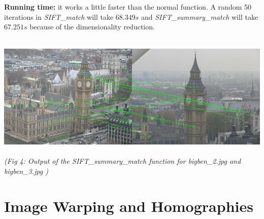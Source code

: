\documentclass{article}
\begin{document}
\begin{enumerate}
				\textbf{Running time:} it works a little faster than the normal function. A random 50 iterations in \textit{SIFT\_match} will take $68.349s$ and \textit{SIFT\_summary\_match} will take $67.251s$ because of the dimensionality reduction.		
				
										
		\begin{center}
			\includegraphics[height=6cm,width=16cm]{3a} \\
			\textit{	(Fig 4: Output of the SIFT\_summary\_match function for bigben\_2.jpg and bigben\_3.jpg )}
		\end{center}
		
	\end{enumerate}
		
	
			\part{ Image Warping and Homographies}	
\end{document}
